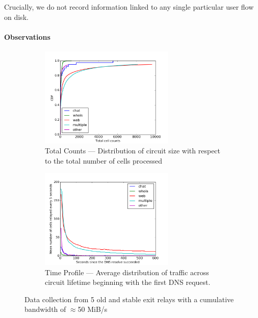 Crucially, we do not record information linked to any single particular user flow on disk.

\paragraph*{Observations}

\begin{figure}[t] \centering
  \begin{subfigure}[t]{0.47\textwidth} \centering\centering
    \includegraphics[width=0.7\textwidth]{images/totcellcountscdf.png}
    \caption{Total Counts --- Distribution of circuit size with respect to the total number of cells processed}
    \label{fig:statsb}
  \end{subfigure}
  \begin{subfigure}[t]{0.47\textwidth} \centering
    \includegraphics[width=0.7\textwidth]{images/exitmeasurement.png}
    \caption{Time Profile --- Average distribution of traffic across circuit lifetime beginning with the first DNS request.}
    \label{fig:statsa}
  \end{subfigure}
  \caption{Data collection from 5 old and stable exit relays with a cumulative bandwidth of $\approx$50 MiB/s}
  \label{fig:stats}
\end{figure}


